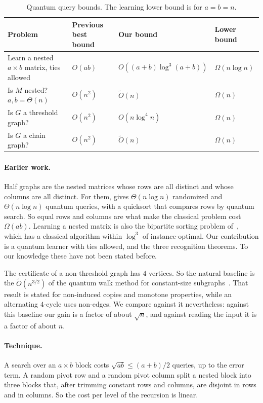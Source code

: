 \documentclass[11pt]{article}
\theoremstyle{remark}
\newcommand{\Ot}{\tilde O}
\begin{document}
\begin{table}[h]
\centering
\small
\renewcommand{\arraystretch}{1.25}
\begin{tabular}{@{}llll@{}}
\toprule
Problem & Previous best bound & Our bound & Lower bound\\
\midrule
Learn a nested $a\times b$ matrix, ties allowed & $O(ab)$ & $O((a+b)\log^3(a+b))$ & $\Omega(n\log n)$ \cite{MSZ25}\\
Is $M$ nested? $a,b=\Theta(n)$ & $O(n^2)$ & $\Ot(n)$ & $\Omega(n)$\\
Is $G$ a threshold graph? & $O(n^2)$ & $O(n\log^4 n)$ & $\Omega(n)$\\
Is $G$ a chain graph? & $O(n^2)$ & $\Ot(n)$ & $\Omega(n)$\\
\bottomrule
\end{tabular}
\caption{Quantum query bounds. The learning lower bound is for $a=b=n$.}
\label{tab:results}
\end{table}

\paragraph{Earlier work.} Half graphs are the nested matrices whose rows are all distinct and whose columns are all distinct. For them, \cite{MSZ25} gives $\Theta(n\log n)$ randomized and $\Theta(n\log n)$ quantum queries, with a quicksort that compares rows by quantum search. So equal rows and columns are what make the classical problem cost $\Omega(ab)$. Learning a nested matrix is also the bipartite sorting problem of~\cite{GJ22}, which has a classical algorithm within $\log^3$ of instance-optimal. Our contribution is a quantum learner with ties allowed, and the three recognition theorems. To our knowledge these have not been stated before.

The certificate of a non-threshold graph has $4$ vertices. So the natural baseline is the $\Ot(n^{3/2})$ of the quantum walk method for constant-size subgraphs~\cite{MSS05}. That result is stated for non-induced copies and monotone properties, while an alternating $4$-cycle uses non-edges. We compare against it nevertheless: against this baseline our gain is a factor of about $\sqrt n$, and against reading the input it is a factor of about $n$.

\paragraph{Technique.} A search over an $a\times b$ block costs $\sqrt{ab}\le(a+b)/2$ queries, up to the error term. A random pivot row and a random pivot column split a nested block into three blocks that, after trimming constant rows and columns, are disjoint in rows and in columns. So the cost per level of the recursion is linear.
\end{document}
